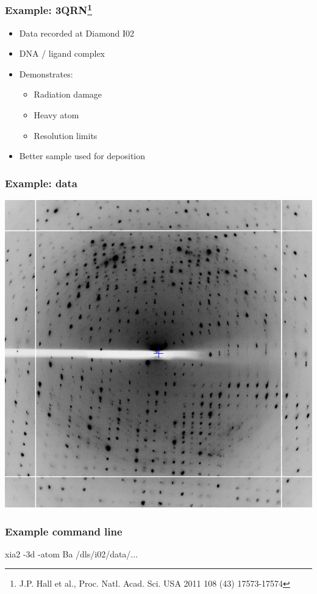 \documentclass[slides,compress]{beamer}
\begin{document}
\begin{frame}
\frametitle{Example: 3QRN\footnote{J.P. Hall et al., Proc. Natl. Acad. Sci. USA 2011 108 (43) 17573-17574}}
\begin{itemize}
\item{Data recorded at Diamond I02}
\item{DNA / ligand complex}
\item{Demonstrates:
\begin{itemize}
\item{Radiation damage}
\item{Heavy atom}
\item{Resolution limits}
\end{itemize}
}
\item{Better sample used for deposition}
\end{itemize}
\end{frame}

\begin{frame}
\frametitle{Example: data}
\begin{center}
\includegraphics[scale=0.35]{figures/3qrn-diffraction.png}
\end{center}
\end{frame}

\begin{frame}
\frametitle{Example command line}
{ \huge
xia2 -3d -atom Ba /dls/i02/data/...
}
\end{frame}
\end{document}
